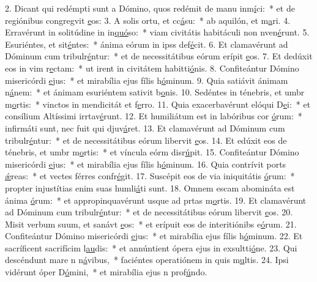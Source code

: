 2. Dicant qui redémpti sunt a Dómino, quos redémit de manu inm\uline{í}ci:~* et de regiónibus congregvit \uline{e}os:
3. A solis ortu, et cc\uline{á}su:~* ab aquilón, et m\uline{a}ri.
4. Erravérunt in solitúdine in in\uline{quó}so:~* viam civitátis habitáculi non nven\uline{é}runt.
5. Esuriéntes, et sit\uline{é}ntes:~* ánima eórum in ipss def\uline{é}cit.
6. Et clamavérunt ad Dóminum cum tribulr\uline{é}ntur:~* et de necessitátibus eórum erípit \uline{e}os.
7. Et dedúxit eos in vim r\uline{e}ctam:~* ut irent in civitátem habitti\uline{ó}nis.
8. Confiteántur Dómino misericórdi \uline{e}jus:~* et mirabília ejus fílis h\uline{ó}minum.
9. Quia satiávit ánimam n\uline{á}nem:~* et ánimam esuriéntem sativit b\uline{o}nis.
10. Sedéntes in ténebris, et umbr m\uline{o}rtis:~* vinctos in mendicitát et f\uline{e}rro.
11. Quia exacerbavérunt elóqui D\uline{e}i:~* et consílium Altíssimi irrtav\uline{é}runt.
12. Et humiliátum est in labóribus cor \uline{ó}rum:~* infirmáti sunt, nec fuit qui djuv\uline{á}ret.
13. Et clamavérunt ad Dóminum cum tribulr\uline{é}ntur:~* et de necessitátibus eórum libervit \uline{e}os.
14. Et edúxit eos de ténebris, et umbr m\uline{o}rtis:~* et víncula eórm disr\uline{ú}pit.
15. Confiteántur Dómino misericórdi \uline{e}jus:~* et mirabília ejus fílis h\uline{ó}minum.
16. Quia contrívit ports \uline{ǽ}reas:~* et vectes férres confr\uline{é}git.
17. Suscépit eos de via iniquitátis \uline{ó}rum:~* propter injustítias enim suas humli\uline{á}ti sunt.
18. Omnem escam abomináta est ánima \uline{ó}rum:~* et appropinquavérunt usque ad prtas m\uline{o}rtis.
19. Et clamavérunt ad Dóminum cum tribulr\uline{é}ntur:~* et de necessitátibus eórum libervit \uline{e}os.
20. Misit verbum suum, et sanávt \uline{e}os:~* et erípuit eos de interitiónibs e\uline{ó}rum.
21. Confiteántur Dómino misericórdi \uline{e}jus:~* et mirabília ejus fílis h\uline{ó}minum.
22. Et sacríficent sacrifícim l\uline{au}dis:~* et annúntient ópera ejus in exsultti\uline{ó}ne.
23. Qui descéndunt mare n n\uline{á}vibus,~* faciéntes operatiónem in quis m\uline{u}ltis.
24. Ipsi vidérunt óper D\uline{ó}mini,~* et mirabília ejus n prof\uline{ú}ndo.
